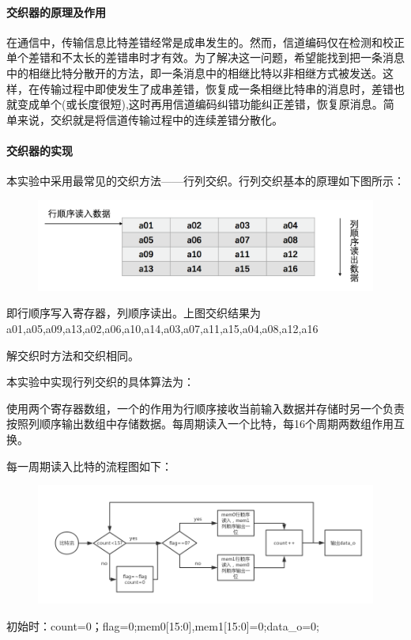 \paragraph{交织器的原理及作用}

在通信中，传输信息比特差错经常是成串发生的。然而，信道编码仅在检测和校正单个差错和不太长的差错串时才有效。为了解决这一问题，希望能找到把一条消息中的相继比特分散开的方法，即一条消息中的相继比特以非相继方式被发送。这样，在传输过程中即使发生了成串差错，恢复成一条相继比特串的消息时，差错也就变成单个(或长度很短),这时再用信道编码纠错功能纠正差错，恢复原消息。简单来说，交织就是将信道传输过程中的连续差错分散化。

\paragraph{交织器的实现}

本实验中采用最常见的交织方法——行列交织。行列交织基本的原理如下图所示：

\begin{figure}[htd]
    \centering
    \includegraphics[width=\textwidth]{images//inter_input.png}
\end{figure}

即行顺序写入寄存器，列顺序读出。上图交织结果为a01,a05,a09,a13,a02,a06,a10,a14,a03,a07,a11,a15,a04,a08,a12,a16

解交织时方法和交织相同。

本实验中实现行列交织的具体算法为：

使用两个寄存器数组，一个的作用为行顺序接收当前输入数据并存储时另一个负责按照列顺序输出数组中存储数据。每周期读入一个比特，每16个周期两数组作用互换。

每一周期读入比特的流程图如下：

\begin{figure}[htd]
    \centering
    \includegraphics[width=\textwidth]{images//inter_pic.png}
\end{figure}

初始时：count=0；flag=0;mem0[15:0],mem1[15:0]=0;data\_o=0;